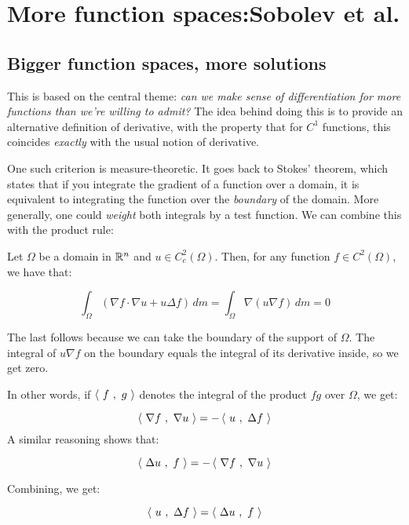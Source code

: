 \documentclass[a4paper]{amsart}
\begin{document}
\section{More function spaces:Sobolev et al.}

\subsection{Bigger function spaces, more solutions}

This is based on the central theme: {\em can we make sense of
  differentiation for more functions than we're willing to admit?} The
idea behind doing this is to provide an alternative definition of
derivative, with the property that for $C^1$ functions, this coincides
{\em exactly} with the usual notion of derivative.

One such criterion is measure-theoretic. It goes back to Stokes'
theorem, which states that if you integrate the gradient of a function
over a domain, it is equivalent to integrating the function over the
{\em boundary} of the domain. More generally, one could {\em weight}
both integrals by a test function. We can combine this with the
product rule:

Let $\Omega$ be a domain in $\mathbb{R}^n$ and $u \in C_c^2(\Omega)$. Then,
for any function $f \in C^2(\Omega)$, we have that:

$$\int_\Omega (\nabla f \cdot \nabla u + u\Delta f) \, dm = \int_\Omega \nabla (u \nabla f) \, dm = 0$$

The last follows because we can take the boundary of the support of
$\Omega$. The integral of $u \nabla f$ on the boundary equals the integral
of its derivative inside, so we get zero.

In other words, if $\left< \ f \ , \ g \ \right>$ denotes the integral of the
product $fg$ over $\Omega$, we get:

\begin{equation}
  \left< \ \nabla f \ , \ \nabla u \ \right> = - \left< \ u \ , \ \Delta f \ \right>
\end{equation}
A similar reasoning shows that:

\begin{equation}\label{gradientfortwicediff}
  \left< \ \Delta u \ , \ f \ \right> = -\left< \ \nabla f \ , \ \nabla u \ \right>
\end{equation}

Combining, we get:

\begin{equation}\label{laplacianfortwicediff}
  \left< \ u \ , \ \Delta f \ \right> = \left< \ \Delta u \ , \ f \ \right>
\end{equation}
\end{document}
